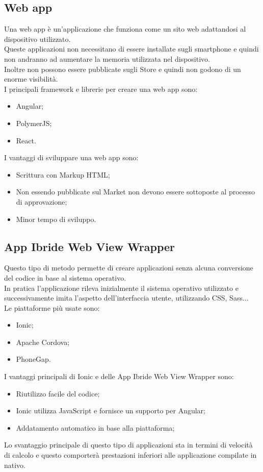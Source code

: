 \subsection{Web app}
Una web app \cite{differenza,apptonative} è un'applicazione che funziona come un sito web adattandosi al dispositivo utilizzato.\\
Queste applicazioni non necessitano di essere installate sugli smartphone e quindi non andranno ad aumentare la memoria utilizzata nel dispositivo.\\
 Inoltre non possono essere pubblicate sugli Store e quindi non godono di un enorme visibilità.\\
I principali framework e librerie per creare una web app sono:
\begin{itemize}
	\item Angular; 
	\item PolymerJS; 
	\item React.
\end{itemize}
I vantaggi di sviluppare una web app sono:
\begin{itemize}
	\item Scrittura con Markup HTML;
	\item Non essendo pubblicate sul Market non devono essere sottoposte al processo di approvazione; 
	\item Minor tempo di sviluppo.
\end{itemize}

\newpage

\subsection{App Ibride Web View Wrapper}
Questo tipo di metodo \cite{differenza,apptonative} permette di creare applicazioni senza alcuna conversione del codice in base al sistema operativo.\\
 In pratica l'applicazione rileva inizialmente il sistema operativo utilizzato e successivamente imita l'aspetto dell'interfaccia utente, utilizzando CSS, Sass...\\
Le piattaforme più usate sono:
\begin{itemize}
\item Ionic; 
\item Apache Cordova; 
\item PhoneGap.
\end{itemize}
I vantaggi principali di Ionic e delle App Ibride Web View Wrapper sono:
\begin{itemize}
	\item Riutilizzo facile del codice; 
	\item Ionic utilizza JavaScript e fornisce un supporto per Angular;
	\item Addatamento automatico in base alla piattaforma; 
\end{itemize}
Lo svantaggio principale di questo tipo di applicazioni sta in termini di velocità di calcolo e questo comporterà prestazioni inferiori alle applicazione compilate in nativo.\\

